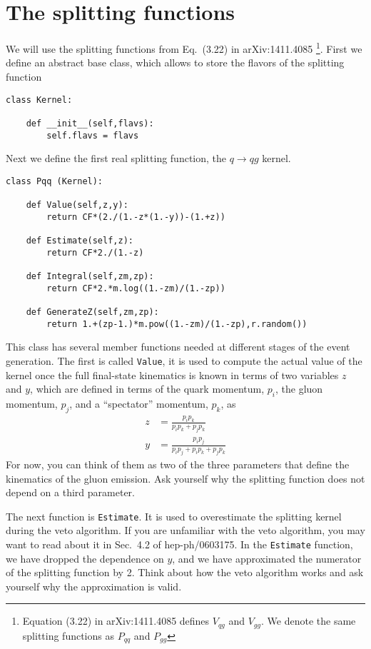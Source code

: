 \documentclass[10pt,fleqn]{scrartcl}
\begin{document}
\section{The splitting functions}
We will use the splitting functions from Eq.~(3.22) in arXiv:1411.4085%
\footnote{Equation (3.22) in arXiv:1411.4085 defines $V_{qg}$ and $V_{gg}$.
  We denote the same splitting functions as $P_{qq}$ and $P_{gg}$}.
First we define an abstract base class, which allows to store the flavors
of the splitting function
\begin{verbatim}
class Kernel:

    def __init__(self,flavs):
        self.flavs = flavs

\end{verbatim}
Next we define the first real splitting function, the $q\to qg$ kernel.
\begin{verbatim}
class Pqq (Kernel):

    def Value(self,z,y):
        return CF*(2./(1.-z*(1.-y))-(1.+z))

    def Estimate(self,z):
        return CF*2./(1.-z)

    def Integral(self,zm,zp):
        return CF*2.*m.log((1.-zm)/(1.-zp))

    def GenerateZ(self,zm,zp):
        return 1.+(zp-1.)*m.pow((1.-zm)/(1.-zp),r.random())

\end{verbatim}
This class has several member functions needed at different stages 
of the event generation. The first is called {\tt Value}, it is used 
to compute the actual value of the kernel once the full final-state
kinematics is known in terms of two variables $z$ and $y$, which are 
defined in terms of the quark momentum, $p_i$, the gluon momentum, $p_j$,
and a ``spectator'' momentum, $p_k$, as
\begin{equation}\label{eq:ps_variables}
  \begin{split}
    z&=\frac{p_ip_k}{p_ip_k+p_jp_k}\\
    y&=\frac{p_ip_j}{p_ip_j+p_ip_k+p_jp_k}
  \end{split}
\end{equation}
For now, you can think of them as two of the three parameters that
define the kinematics of the gluon emission. Ask yourself why the splitting
function does not depend on a third parameter.

The next function is {\tt Estimate}. It is used to overestimate the splitting 
kernel during the veto algorithm. If you are unfamiliar with the veto algorithm, 
you may want to read about it in Sec.~4.2 of hep-ph/0603175. In the {\tt Estimate}
function, we have dropped the dependence on $y$, and we have approximated the
numerator of the splitting function by 2. Think about how the veto algorithm works 
and ask yourself why the approximation is valid.
\end{document}
